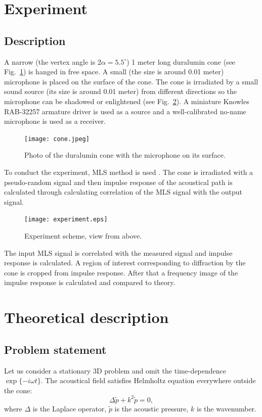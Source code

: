 \documentclass{procDDs}
\begin{document}
\section{Experiment}

\subsection{Description}
A narrow (the vertex angle is $2\alpha = 5.5 ^{\circ}$) 1 meter long duralumin cone (see Fig.~\ref{cone}) is hanged in free space. A small (the size is around 0.01 meter) microphone is placed on the surface of the cone. The cone is irradiated by a small sound source (its size is around 0.01 meter) from different directions so the microphone can be shadowed or enlightened (see Fig.~\ref{exp_scheme}). A miniature Knowles RAB-32257 armature driver is used as a source and a well-calibrated no-name microphone is used as a receiver. 

\begin{figure}[t!]\centering
	\texttt{[image: cone.jpeg]}
	\caption{Photo of the duralumin cone with the microphone on its surface.}\label{cone}
\end{figure}


To conduct the experiment, MLS method is used \cite{Shanin}. The cone is irradiated with a pseudo-random signal and then impulse response of the acoustical path is calculated through calculating correlation of the MLS signal with the output signal.

\begin{figure}[t!]\centering
	\texttt{[image: experiment.eps]}
	\caption{Experiment scheme, view from above.}\label{exp_scheme}
\end{figure}

The input MLS signal is correlated with the measured signal and impulse response is calculated. A region of interest corresponding to diffraction by the cone is cropped from impulse response. After that a frequency image of the impulse response is calculated and compared to theory.


\section{Theoretical description}

\subsection{Problem statement}
Let us consider a stationary 3D problem and omit the time-dependence $\exp\{-i\omega t\}$.
The acoustical field satisfies Helmholtz equation everywhere outside the cone:
\begin{equation}\label{helm}                     
\Delta \tilde{p} + k^2 \tilde{p} = 0,                                         
\end{equation}
where $\Delta$ is the Laplace operator, $\tilde{p}$ is the acoustic pressure, $k$ is the wavenumber. 
\end{document}
